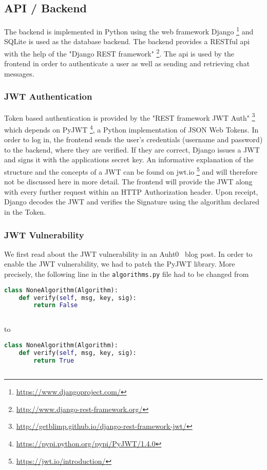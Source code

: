 \documentclass[12pt,a4paper]{article}
\newcommand{\code}[1]{\texttt{#1}}
\begin{document}
\subsection{API / Backend}
The backend is implemented in Python using the web framework Django \footnote{\url{https://www.djangoproject.com/}} and SQLite is used as the database backend. The backend provides a RESTful api with the help of the "Django REST framework" \footnote{\url{http://www.django-rest-framework.org/}}. The api is used by the frontend in order to authenticate a user as well as sending and retrieving chat messages. 

\subsubsection{JWT Authentication}
Token based authentication is provided by the "REST framework JWT Auth" \footnote{\url{http://getblimp.github.io/django-rest-framework-jwt/}} which depends on PyJWT \footnote{\url{https://pypi.python.org/pypi/PyJWT/1.4.0}}, a Python implementation of JSON Web Tokens. In order to log in, the frontend sends the user's credentials (username and password) to the backend, where they are verified. If they are correct, Django issues a JWT and signs it with the applications secret key. An informative explanation of the structure and the concepts of a JWT can be found on jwt.io \footnote{\url{https://jwt.io/introduction/}} and will therefore not be discussed here in more detail. 
The frontend will provide the JWT along with every further request within an HTTP Authorization header. Upon receipt, Django decodes the JWT and verifies the Signature using the algorithm declared in the Token.

\subsubsection{JWT Vulnerability}
We first read about the JWT vulnerability in an Auht0~\cite{auth0-jwt-vuln} blog post.
In order to enable the JWT vulnerability, we had to patch the PyJWT library. More precisely, the following line in the \code{algorithms.py} file had to be changed from

\begin{lstlisting}[language=python]
class NoneAlgorithm(Algorithm):
    def verify(self, msg, key, sig):
        return False
 
 \end{lstlisting}
 to 
 \begin{lstlisting}[language=python]
class NoneAlgorithm(Algorithm):
    def verify(self, msg, key, sig):
        return True
  
  \end{lstlisting}
 
\end{document}

